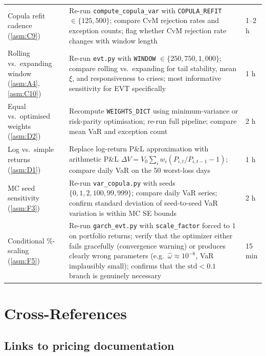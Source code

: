 \documentclass[11pt,a4paper]{article}
\newcommand{\code}[1]{\texttt{#1}}
\begin{document}
\begin{tabularx}{\textwidth}{@{}p{3.8cm} X p{2.0cm}@{}}
Copula refit cadence (\cref{asm:C9}) &
Re-run \code{compute\_copula\_var} with \code{COPULA\_REFIT}
$\in \{125, 500\}$; compare CvM rejection rates and exception counts;
flag whether CvM rejection rate changes with window length &
1--2 h \\[4pt]

Rolling vs.\ expanding window (\cref{asm:A4}, \cref{asm:C10}) &
Re-run \code{evt.py} with \code{WINDOW}
$\in \{250, 750, 1{,}000\}$; compare rolling vs.\ expanding for
tail stability, mean $\xi$, and responsiveness to crises;
most informative sensitivity for EVT specifically &
1 h \\[4pt]

Equal vs.\ optimised weights (\cref{asm:D2}) &
Recompute \code{WEIGHTS\_DICT} using minimum-variance or risk-parity
optimisation; re-run full pipeline; compare mean VaR and exception count &
2 h \\[4pt]

Log vs.\ simple returns (\cref{asm:D1}) &
Replace log-return P\&L approximation with arithmetic P\&L
$\Delta V = V_0 \sum_i w_i (P_{i,t}/P_{i,t-1} - 1)$;
compare daily VaR on the 50 worst-loss days &
1 h \\[4pt]

MC seed sensitivity (\cref{asm:F3}) &
Re-run \code{var\_copula.py} with seeds
$\{0, 1, 2, 100, 99{,}999\}$; compare daily VaR series;
confirm standard deviation of seed-to-seed VaR variation
is within MC SE bounds &
2 h \\[4pt]

Conditional \%-scaling (\cref{asm:F5}) &
Re-run \code{garch\_evt.py} with \code{scale\_factor} forced to $1$
on portfolio returns; verify that the optimizer either fails gracefully
(convergence warning) or produces clearly wrong parameters
(e.g.\ $\hat{\omega} \approx 10^{-6}$, VaR implausibly small);
confirms that the $\mathrm{std} < 0.1$ branch is genuinely necessary &
15 min \\[4pt]

\bottomrule
\end{tabularx}

\section{Cross-References}\label{sec:cross-references}

\subsection{Links to pricing documentation}
\end{document}
